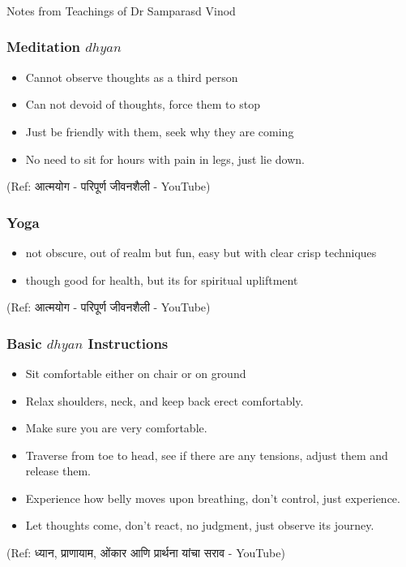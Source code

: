\begin{frame}[fragile]\frametitle{}
\begin{center}
{\Large Notes from Teachings of Dr Samparasd Vinod}
\end{center}
\end{frame}

\begin{frame}[fragile]\frametitle{Meditation $dhyan$}

	\begin{itemize}
	\item Cannot observe thoughts as a third person
	\item Can not devoid of thoughts, force them to stop
	\item Just be friendly with them, seek why they are coming
	\item No need to sit for hours with pain in legs, just lie down.
	\end{itemize}

{\tiny (Ref:  आत्मयोग - परिपूर्ण जीवनशैली - YouTube)}

\end{frame}


\begin{frame}[fragile]\frametitle{Yoga}

	\begin{itemize}
	\item not obscure, out of realm but fun, easy but with clear crisp techniques
	\item though good for health, but its for spiritual upliftment
	\end{itemize}

{\tiny (Ref:  आत्मयोग - परिपूर्ण जीवनशैली - YouTube)}

\end{frame}

\begin{frame}[fragile]\frametitle{Basic $dhyan$ Instructions}

	\begin{itemize}
	\item Sit comfortable either on chair or on ground
	\item Relax shoulders, neck, and keep back erect comfortably.
	\item Make sure you are very comfortable.
	\item Traverse from toe to head, see if there are any tensions, adjust them and release them.
	\item Experience how belly moves upon breathing, don't control, just experience.
	\item Let thoughts come, don't react, no judgment, just observe its journey.
	\end{itemize}

{\tiny (Ref:  ध्यान, प्राणायाम, ओंकार आणि प्रार्थना यांचा सराव - YouTube)}

\end{frame}

